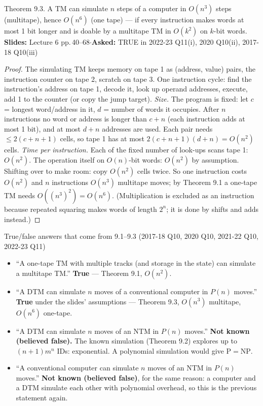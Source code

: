 \documentclass[10.5pt,a4paper]{article}
\newcommand{\src}[2]{{\footnotesize\color{gray!70!black}\textbf{Slides:} #1\enspace$\cdot$\enspace\textbf{Asked:} #2}\par}
\newcommand{\NP}{\mathrm{NP}}
\renewcommand{\P}{\mathrm{P}}
\begin{document}
\begin{thm}{Theorem 9.3. A TM can simulate $n$ steps of a computer in $O(n^3)$ steps (multitape), hence $O(n^6)$ (one tape) --- if every
instruction makes words at most 1 bit longer and is doable by a multitape TM in $O(k^2)$ on $k$-bit words.}
\src{Lecture 6 pp.\,40--68}{TRUE in 2022-23 Q11(i), 2020 Q10(ii), 2017-18 Q10(iii)}\end{thm}
\begin{proof}
The simulating TM keeps memory on tape 1 as (address, value) pairs, the instruction counter on tape 2, scratch on tape 3. One instruction cycle:
find the instruction's address on tape 1, decode it, look up operand addresses, execute, add 1 to the counter (or copy the jump target).
\emph{Size.} The program is fixed: let $c$ = longest word/address in it, $d$ = number of words it occupies. After $n$ instructions no word or
address is longer than $c+n$ (each instruction adds at most 1 bit), and at most $d+n$ addresses are used. Each pair needs $\le2(c+n+1)$
cells, so tape 1 has at most $2(c+n+1)(d+n)=O(n^2)$ cells. \emph{Time per instruction.} Each of the fixed number of look-ups scans
tape 1: $O(n^2)$. The operation itself on $O(n)$-bit words: $O(n^2)$ by assumption. Shifting over to make room: copy $O(n^2)$ cells twice.
So one instruction costs $O(n^2)$ and $n$ instructions $O(n^3)$ multitape moves; by Theorem 9.1 a one-tape TM needs $O((n^3)^2)=O(n^6)$.
(Multiplication is excluded as an instruction because repeated squaring makes words of length $2^n$; it is done by shifts and adds instead.)
\end{proof}

\begin{ans}{True/false answers that come from 9.1--9.3 (2017-18 Q10, 2020 Q10, 2021-22 Q10, 2022-23 Q11)}
\begin{itemize}
\item ``A one-tape TM with multiple tracks (and storage in the state) can simulate a multitape TM.'' \textbf{True} --- Theorem 9.1, $O(n^2)$.
\item ``A DTM can simulate $n$ moves of a conventional computer in $P(n)$ moves.'' \textbf{True} under the slides' assumptions --- Theorem 9.3,
$O(n^3)$ multitape, $O(n^6)$ one-tape.
\item ``A DTM can simulate $n$ moves of an NTM in $P(n)$ moves.'' \textbf{Not known (believed false).} The known simulation (Theorem 9.2)
explores up to $(n+1)m^n$ IDs: exponential. A polynomial simulation would give $\P=\NP$.
\item ``A conventional computer can simulate $n$ moves of an NTM in $P(n)$ moves.'' \textbf{Not known (believed false)}, for the same
reason: a computer and a DTM simulate each other with polynomial overhead, so this is the previous statement again.
\end{itemize}
\end{ans}
\end{document}
